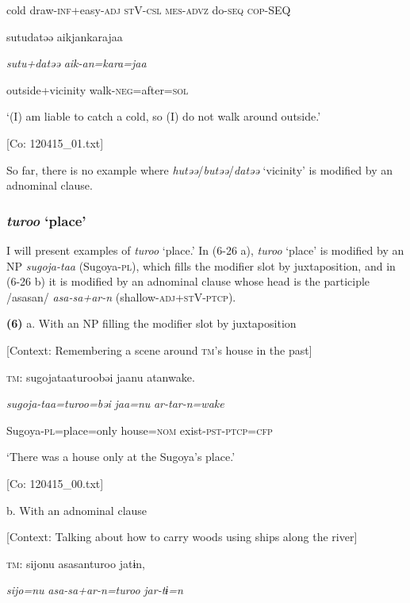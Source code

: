       cold  draw-\textsc{inf}+easy-\textsc{adj}  \textsc{st}V-\textsc{csl}  \textsc{mes}-\textsc{advz}  do-\textsc{seq}  \textsc{cop}-SEQ

      sutudatəə  aikjankarajaa

      \textit{sutu+datəə}  \textit{aik-an=kara=jaa}

      outside+vicinity  walk-\textsc{neg}=after=\textsc{sol}

      ‘(I) am liable to catch a cold, so (I) do not walk around outside.’

      [Co: 120415\_01.txt]

So far, there is no example where \textit{hutəə}/\textit{butəə}/\textit{datəə} ‘vicinity’ is modified by an adnominal clause.

\subsubsection{ \textit{turoo} ‘place’}

I will present examples of \textit{turoo} ‘place.’ In (6-26 a), \textit{turoo} ‘place’ is modified by an NP \textit{sugoja-taa} (Sugoya-\textsc{pl}), which fills the modifier slot by juxtaposition, and in (6-26 b) it is modified by an adnominal clause whose head is the participle /asasan/ \textit{asa-sa+ar-n} (shallow-\textsc{adj}+\textsc{st}V-\textsc{ptcp}).

\textbf{(6)}  a.  With an NP filling the modifier slot by juxtaposition

    [Context: Remembering a scene around \textsc{tm}’s house in the past]

    \textsc{tm}:  sugojataaturoobəi  jaanu  atanwake.

      \textit{sugoja-taa=turoo=bəi}  \textit{jaa=nu}  \textit{ar-tar-n=wake}

      Sugoya-\textsc{pl}=place=only  house=\textsc{nom}  exist-\textsc{pst}-\textsc{ptcp}=\textsc{cfp}

      ‘There was a house only at the Sugoya’s place.’

      [Co: 120415\_00.txt]

  b.  With an adnominal clause

    [Context: Talking about how to carry woods using ships along the river]

    \textsc{tm}:  {\textbar}sijo{\textbar}nu  asasanturoo  jatɨn,

      \textit{sijo=nu}  \textit{asa-sa+ar-n=turoo}  \textit{jar-tɨ=n}

